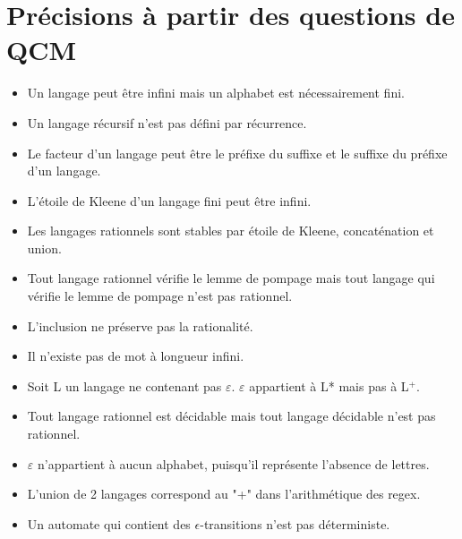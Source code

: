\documentclass{article}
\begin{document}
\section{Précisions à partir des questions de QCM}
\begin{itemize}
	\item Un langage peut être infini mais un alphabet est nécessairement fini.
	\item Un langage récursif n'est pas défini par récurrence.
	\item Le facteur d'un langage peut être le préfixe du suffixe et le suffixe du préfixe d'un langage.
	\item L'étoile de Kleene d'un langage fini peut être infini.
	\item Les langages rationnels sont stables par étoile de Kleene, concaténation et union.
	\item Tout langage rationnel vérifie le lemme de pompage mais tout langage qui vérifie le lemme de pompage n'est pas rationnel.
	\item L'inclusion ne préserve pas la rationalité.
	\item Il n'existe pas de mot à longueur infini.
    \item Soit L un langage ne contenant pas $\varepsilon$. $\varepsilon$ appartient à L* mais pas à L$^{+}$.
    \item Tout langage rationnel est décidable mais tout langage décidable n'est pas rationnel.
    \item $\varepsilon$ n'appartient à aucun alphabet, puisqu'il représente l'absence de lettres.
    \item L'union de 2 langages correspond au "+" dans l'arithmétique des regex.
    \item Un automate qui contient des $\epsilon$-transitions n'est pas déterministe.
\end{itemize}
\end{document}
